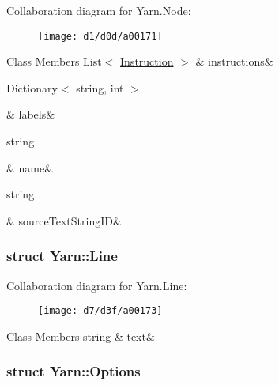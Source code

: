 Collaboration diagram for Yarn.\-Node\-:
\nopagebreak
\begin{figure}[H]
\begin{center}
\leavevmode
\texttt{[image: d1/d0d/a00171]}
\end{center}
\end{figure}
\begin{DoxyFields}{Class Members}
\hypertarget{a00026_a156723a9252b62d288ddf611939ea7c3}{List$<$ \hyperlink{a00044}{Instruction} $>$}\label{a00026_a156723a9252b62d288ddf611939ea7c3}
&
instructions&
\\
\hline

\hypertarget{a00026_a9afa49f4fbc72e806a0210cb4198f12e}{Dictionary$<$ string, int $>$}\label{a00026_a9afa49f4fbc72e806a0210cb4198f12e}
&
labels&
\\
\hline

\hypertarget{a00026_a107b0de3fcfc65e99913edc01b5ce9db}{string}\label{a00026_a107b0de3fcfc65e99913edc01b5ce9db}
&
name&
\\
\hline

\hypertarget{a00026_a09c6af5b50925d0876283b84281b3ed4}{string}\label{a00026_a09c6af5b50925d0876283b84281b3ed4}
&
source\-Text\-String\-I\-D&
\\
\hline

\end{DoxyFields}
\label{db/d44/a00162}
\hypertarget{a00026_db/d44/a00162}{}
\subsubsection{struct Yarn\-:\-:Line}


Collaboration diagram for Yarn.\-Line\-:
\nopagebreak
\begin{figure}[H]
\begin{center}
\leavevmode
\texttt{[image: d7/d3f/a00173]}
\end{center}
\end{figure}
\begin{DoxyFields}{Class Members}
\hypertarget{a00026_a81d1f04bbb4cf6642d2bd685bda1da20}{string}\label{a00026_a81d1f04bbb4cf6642d2bd685bda1da20}
&
text&
\\
\hline

\end{DoxyFields}
\label{db/ddf/a00164}
\hypertarget{a00026_db/ddf/a00164}{}
\subsubsection{struct Yarn\-:\-:Options}


